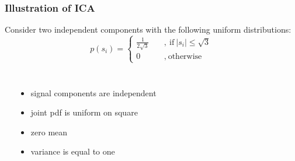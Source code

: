 \begin{frame}
  \frametitle{Illustration of ICA}

  Consider two independent components with the following uniform distributions:
%
  {\footnotesize
  \begin{displaymath}
    p(s_i) = \begin{cases}
               \frac{1}{2\sqrt{3}} \quad &, ~\mbox{if}~|s_i| \leq \sqrt{3} \\
               0 \quad &, ~\mbox{otherwise}
             \end{cases}
  \end{displaymath}
  }

  \begin{columns}
    \pause
      \vspace*{-.7cm}
      \begin{center}
        \resizebox{.9\linewidth}{!}{
          
        }
      \end{center}
      \pause
      \begin{itemize}
        \item signal components are independent \pause
        \item joint pdf is uniform on square \pause
        \item zero mean \pause
        \item variance is equal to one
      \end{itemize}
  \end{columns}
\end{frame}


